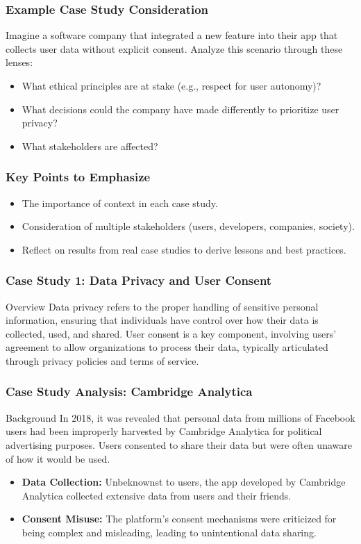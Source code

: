 \documentclass{beamer}
\begin{document}
\begin{frame}[fragile]
    \frametitle{Example Case Study Consideration}
    Imagine a software company that integrated a new feature into their app that collects user data without explicit consent. Analyze this scenario through these lenses:
    \begin{itemize}
        \item What ethical principles are at stake (e.g., respect for user autonomy)?
        \item What decisions could the company have made differently to prioritize user privacy?
        \item What stakeholders are affected?
    \end{itemize}
\end{frame}

\begin{frame}[fragile]
    \frametitle{Key Points to Emphasize}
    \begin{itemize}
        \item The importance of context in each case study.
        \item Consideration of multiple stakeholders (users, developers, companies, society).
        \item Reflect on results from real case studies to derive lessons and best practices.
    \end{itemize}
\end{frame}

\begin{frame}[fragile]
    \frametitle{Case Study 1: Data Privacy and User Consent}
    \begin{block}{Overview}
        Data privacy refers to the proper handling of sensitive personal information, ensuring that individuals have control over how their data is collected, used, and shared. User consent is a key component, involving users’ agreement to allow organizations to process their data, typically articulated through privacy policies and terms of service.
    \end{block}
\end{frame}

\begin{frame}[fragile]
    \frametitle{Case Study Analysis: Cambridge Analytica}
    \begin{block}{Background}
        In 2018, it was revealed that personal data from millions of Facebook users had been improperly harvested by Cambridge Analytica for political advertising purposes. Users consented to share their data but were often unaware of how it would be used.
    \end{block}
    
    \begin{itemize}
        \item \textbf{Data Collection:} Unbeknownst to users, the app developed by Cambridge Analytica collected extensive data from users and their friends.
        \item \textbf{Consent Misuse:} The platform's consent mechanisms were criticized for being complex and misleading, leading to unintentional data sharing.
    \end{itemize}
\end{frame}
\end{document}
